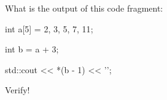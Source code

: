 What is the output of this code fragment:



\begin{consolethree}[escapeinside=||]

int a[5] = {2, 3, 5, 7, 11};

int b = a + 3;

std::cout << *(b - 1) << '\n';

\end{consolethree}



Verify!

